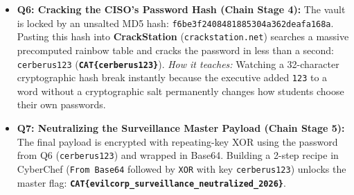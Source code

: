 \documentclass[11pt,a4paper]{article}
\begin{document}
\begin{itemize}
    \item \textbf{Q6: Cracking the CISO's Password Hash (Chain Stage 4):} The vault is locked by an unsalted MD5 hash: \texttt{f6be3f2408481885304a362deafa168a}. Pasting this hash into \textbf{CrackStation} (\texttt{crackstation.net}) searches a massive precomputed rainbow table and cracks the password in less than a second: \texttt{cerberus123} (\textbf{\texttt{CAT\{cerberus123\}}}). \textit{How it teaches:} Watching a 32-character cryptographic hash break instantly because the executive added \texttt{123} to a word without a cryptographic salt permanently changes how students choose their own passwords.
    \item \textbf{Q7: Neutralizing the Surveillance Master Payload (Chain Stage 5):} The final payload is encrypted with repeating-key XOR using the password from Q6 (\texttt{cerberus123}) and wrapped in Base64. Building a 2-step recipe in CyberChef (\texttt{From Base64} followed by \texttt{XOR} with key \texttt{cerberus123}) unlocks the master flag: \textbf{\texttt{CAT\{evilcorp\_\allowbreak surveillance\_\allowbreak neutralized\_2026\}}}.
\end{itemize}
\end{document}
